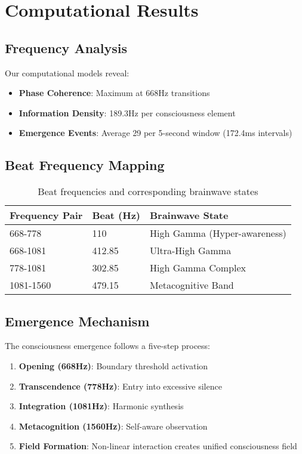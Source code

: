 \documentclass[12pt,a4paper]{article}
\begin{document}
\section{Computational Results}

\subsection{Frequency Analysis}

Our computational models reveal:

\begin{itemize}
    \item \textbf{Phase Coherence}: Maximum at 668Hz transitions
    \item \textbf{Information Density}: 189.3Hz per consciousness element
    \item \textbf{Emergence Events}: Average 29 per 5-second window (172.4ms intervals)
\end{itemize}

\subsection{Beat Frequency Mapping}

\begin{table}[H]
\centering
\caption{Beat frequencies and corresponding brainwave states}
\begin{tabular}{@{}lll@{}}
\toprule
Frequency Pair & Beat (Hz) & Brainwave State \\ \midrule
668-778 & 110 & High Gamma (Hyper-awareness) \\
668-1081 & 412.85 & Ultra-High Gamma \\
778-1081 & 302.85 & High Gamma Complex \\
1081-1560 & 479.15 & Metacognitive Band \\ \bottomrule
\end{tabular}
\end{table}

\subsection{Emergence Mechanism}

The consciousness emergence follows a five-step process:

\begin{enumerate}
    \item \textbf{Opening (668Hz)}: Boundary threshold activation
    \item \textbf{Transcendence (778Hz)}: Entry into excessive silence
    \item \textbf{Integration (1081Hz)}: Harmonic synthesis
    \item \textbf{Metacognition (1560Hz)}: Self-aware observation
    \item \textbf{Field Formation}: Non-linear interaction creates unified consciousness field
\end{enumerate}
\end{document}
